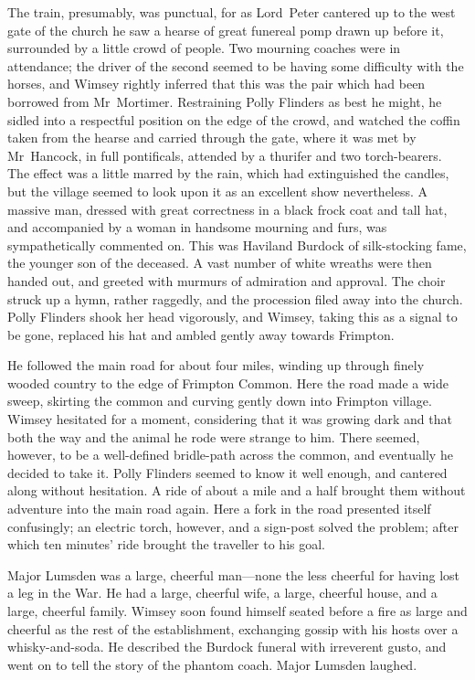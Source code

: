 The train, presumably, was punctual, for as Lord~Peter cantered up to the west gate of the church he saw a hearse of great funereal pomp drawn up before it, surrounded by a little crowd of people. Two mourning coaches were in attendance; the driver of the second seemed to be having some difficulty with the horses, and Wimsey rightly inferred that this was the pair which had been borrowed from Mr~Mortimer. Restraining Polly Flinders as best he might, he sidled into a respectful position on the edge of the crowd, and watched the coffin taken from the hearse and carried through the gate, where it was met by Mr~Hancock, in full pontificals, attended by a thurifer and two torch-bearers. The effect was a little marred by the rain, which had extinguished the candles, but the village seemed to look upon it as an excellent show nevertheless. A massive man, dressed with great correctness in a black frock coat and tall hat, and accompanied by a woman in handsome mourning and furs, was sympathetically commented on. This was Haviland Burdock of silk-stocking fame, the younger son of the deceased. A vast number of white wreaths were then handed out, and greeted with murmurs of admiration and approval. The choir struck up a hymn, rather raggedly, and the procession filed away into the church. Polly Flinders shook her head vigorously, and Wimsey, taking this as a signal to be gone, replaced his hat and ambled gently away towards Frimpton.

He followed the main road for about four miles, winding up through finely wooded country to the edge of Frimpton Common. Here the road made a wide sweep, skirting the common and curving gently down into Frimpton village. Wimsey hesitated for a moment, considering that it was growing dark and that both the way and the animal he rode were strange to him. There seemed, however, to be a well-defined bridle-path across the common, and eventually he decided to take it. Polly Flinders seemed to know it well enough, and cantered along without hesitation. A ride of about a mile and a half brought them without adventure into the main road again. Here a fork in the road presented itself confusingly; an electric torch, however, and a sign-post solved the problem; after which ten minutes' ride brought the traveller to his goal.

Major Lumsden was a large, cheerful man—none the less cheerful for having lost a leg in the War. He had a large, cheerful wife, a large, cheerful house, and a large, cheerful family. Wimsey soon found himself seated before a fire as large and cheerful as the rest of the establishment, exchanging gossip with his hosts over a whisky-and-soda. He described the Burdock funeral with irreverent gusto, and went on to tell the story of the phantom coach. Major Lumsden laughed.

